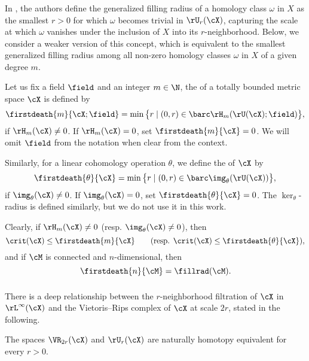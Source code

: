\subsubsection{} \label{ss:beta v.s. fillrad}

In \cite[Defn.~9.44]{lim2024vietoris}, the authors define the generalized filling radius of a homology class \(\omega\) in \(X\) as the smallest \(r > 0\) for which \(\omega\) becomes trivial in \(\rU_r(\cX)\), capturing the scale at which \(\omega\) vanishes under the inclusion of \(X\) into its \(r\)-neighborhood.
Below, we consider a weaker version of this concept, which is equivalent to the smallest generalized filling radius among all non-zero homology classes \(\omega\) in \(X\) of a given degree $m$.

Let us fix a field \(\field\) and an integer \(m \in \N\), the  of a totally bounded metric space \(\cX\) is defined by
\[
\firstdeath{m}{\cX; \field} =
\min \big\{r \mid (0, r) \in \barc \rH_m(\rU(\cX); \field)\big\},
\]
if \(\rH_m(\cX) \neq 0\).
If \(\rH_m(\cX) = 0\), set \(\firstdeath{m}{\cX} = 0\).
We will omit \(\field\) from the notation when clear from the context.

Similarly, for a linear cohomology operation \(\theta\), we define the  of \(\cX\) by
\[
\firstdeath{\theta}{\cX} = \min \big\{r \mid (0, r) \in \barc \img_\theta(\rU(\cX))\big\},
\]
if \(\img_\theta(\cX) \neq 0\).
If \(\img_\theta(\cX) = 0\), set $\firstdeath{\theta}{\cX} = 0$.
The \(\ker_\theta\)-radius is defined similarly, but we do not use it in this work.

Clearly, if \(\rH_m(\cX) \neq 0\) (resp. \(\img_\theta(\cX) \neq 0\)), then
\[
\crit(\cX) \leq \firstdeath{m}{\cX} \qquad (\text{resp. }\crit(\cX) \leq \firstdeath{\theta}{\cX}),
\]
and if $\cM$ is connected and $n$-dimensional, then
\[
\firstdeath{n}{\cM} = \fillrad(\cM).
\]


\subsubsection{}\label{ss:kuratowski_vr}

There is a deep relationship between the \(r\)-neighborhood filtration of $\cX$ in $\rL^\infty(\cX)$ and the Vietoris--Rips complex of \(\cX\) at scale \(2r\), stated in the following.

\proposition \cite[Thm.~4.1]{lim2024vietoris} The spaces $\VR_{2r}(\cX)$ and $\rU_r(\cX)$ are naturally homotopy equivalent for every \(r > 0\).


